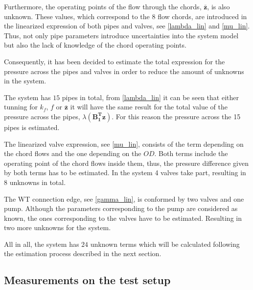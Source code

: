 %


Furthermore, the operating points of the flow through the chords, $\pmb{\bar{z}}$, is also unknown. These values, which correspond to the $8$ flow chords, are introduced in the linearized expression of both pipes 
and valves, see \eqref{lambda_lin} and \eqref{mu_lin}. Thus, not only pipe parameters introduce uncertainties into the system model but also the lack of knowledge of the chord operating points.

Consequently, it has been decided to estimate the total expression for the pressure across the pipes and valves in order to reduce the amount of unknowns in the system.

The system has $15$ pipes in total,  from \eqref{lambda_lin} it can be seen that either tunning for $k_f$, $f$ or $\pmb{\bar{z}}$ it will have the same result for the total
value of the pressure across the pipes, $\lambda(\pmb{{B_1^{T}}}\pmb{z})$. For this reason the pressure across the 15 pipes is estimated.

The linearized valve expression, see \eqref{mu_lin}, consists of the term depending on the chord flows and the one depending on the $OD$. Both terms include the operating 
point of the chord flows inside them, thus, the pressure difference given by both terms has to be estimated. In the system 4 valves take part, 
resulting in 8 unknowns in total. 

The WT connection edge, see \eqref{gamma_lin}, is conformed by two valves and one pump. Although the parameters corresponding to the pump are considered as known, the ones 
corresponding to the valves have to be estimated. Resulting in two more unknowns for the system. 

All in all, the system has $24$ unknown terms which will be calculated following the estimation process described in the next section.
\subsection{Measurements on the test setup}
\label{LinParamEst_measurements}

